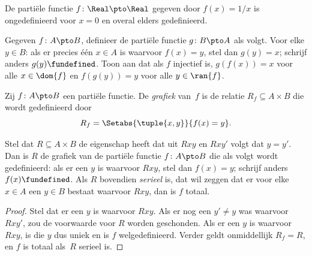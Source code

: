 \documentclass[openany]{memoir}
\begin{document}
\begin{ex}
De partiële functie $f \colon \Real \pto \Real$ gegeven door $f(x) =
1/x$ is ongedefinieerd voor $x = 0$ en overal elders gedefinieerd.
\end{ex}

\begin{prob}
Gegeven $f\colon A \pto B$, definieer de partiële functie $g\colon B
\pto A$ als volgt. Voor elke $y \in B$: als er precies één $x \in A$
is waarvoor $f(x) = y$, stel dan $g(y) = x$; schrijf anders $g(y)
\fundefined$. Toon aan dat als $f$ injectief is, $g(f(x)) = x$ voor
alle $x \in \dom{f}$ en $f(g(y)) = y$ voor alle $y \in \ran{f}$.
\end{prob}

\begin{defn}
Zij $f\colon A \pto B$ een partiële functie. De \emph{grafiek} van~$f$
is de relatie $R_f \subseteq A \times B$ die wordt gedefinieerd door
\[
R_f = \Setabs{\tuple{x,y}}{f(x) = y}.
\]
\end{defn}

\begin{prop}
Stel dat $R \subseteq A \times B$ de eigenschap heeft dat uit $Rxy$ en
$Rxy'$ volgt dat $y = y'$. Dan is $R$ de grafiek van de partiële
functie $f\colon A \pto B$ die als volgt wordt gedefinieerd: als er een
$y$ is waarvoor $Rxy$, stel dan $f(x) = y$; schrijf anders $f(x)
\fundefined$. Als $R$ bovendien \emph{serieel} is, dat wil zeggen dat
er voor elke $x \in A$ een $y \in B$ bestaat waarvoor $Rxy$, dan is
$f$ totaal.
\end{prop}

\begin{proof}
Stel dat er een $y$ is waarvoor $Rxy$. Als er nog een $y' \neq y$ was
waarvoor $Rxy'$, zou de voorwaarde voor $R$ worden geschonden. Als er
een $y$ is waarvoor $Rxy$, is die $y$ dus uniek en is $f$
welgedefinieerd. Verder geldt onmiddellijk $R_f = R$, en $f$ is totaal
als~$R$ serieel is.
\end{proof}
\endgroup
\OLEndChapterHook

\begingroup
\def\olfilename{OLP-0027}
\def\olfilepath{content/sets-functions-relations/size-of-sets/}
\hypertarget{unit-OLP-0027}{}
\end{document}

